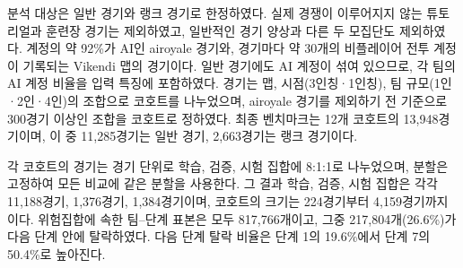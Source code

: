분석 대상은 일반 경기와 랭크 경기로 한정하였다.
실제 경쟁이 이루어지지 않는 튜토리얼과 훈련장 경기는 제외하였고, 일반적인 경기 양상과 다른 두 모집단도 제외하였다.
계정의 약 92\%가 AI인 airoyale 경기와, 경기마다 약 30개의 비플레이어 전투 계정이 기록되는 Vikendi 맵의 경기이다.
일반 경기에도 AI 계정이 섞여 있으므로, 각 팀의 AI 계정 비율을 입력 특징에 포함하였다.
경기는 맵, 시점(3인칭·1인칭), 팀 규모(1인·2인·4인)의 조합으로 코호트를 나누었으며, airoyale 경기를 제외하기 전 기준으로 300경기 이상인 조합을 코호트로 정하였다.
최종 벤치마크는 12개 코호트의 13,948경기이며, 이 중 11,285경기는 일반 경기, 2,663경기는 랭크 경기이다.

각 코호트의 경기는 경기 단위로 학습, 검증, 시험 집합에 8:1:1로 나누었으며, 분할은 고정하여 모든 비교에 같은 분할을 사용한다.
그 결과 학습, 검증, 시험 집합은 각각 11,188경기, 1,376경기, 1,384경기이며, 코호트의 크기는 224경기부터 4,159경기까지이다.
위험집합에 속한 팀--단계 표본은 모두 817,766개이고, 그중 217,804개(26.6\%)가 다음 단계 안에 탈락하였다.
다음 단계 탈락 비율은 단계 1의 19.6\%에서 단계 7의 50.4\%로 높아진다.
